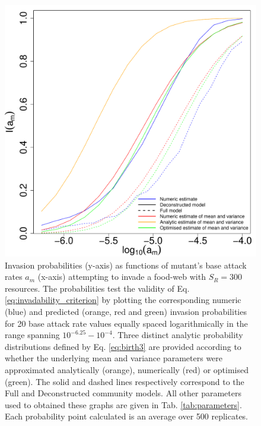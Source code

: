 \documentclass[a4paper]{report}
\begin{document}
{%
\begin{figure}[H]
\centering{}
\includegraphics[scale=0.5]{../Images/Invasion_Probabillity.pdf}
 \caption{Invasion probabilities (y-axis) as functions of mutant's base attack rates $a_m$ (x-axis) attempting to invade a food-web with $S_R=300$ resources. The probabilities test the validity of Eq. \eqref{eq:invadability_criterion} by plotting the corresponding numeric (blue) and predicted (orange, red and green) invasion probabilities for 20 base attack rate values equally spaced logarithmically in the range spanning $10^{-6.25} - 10^{-4}$. Three distinct analytic probability distributions defined by Eq. \eqref{eq:birth3} are provided according to whether the underlying mean and variance parameters were approximated analytically (orange), numerically (red) or optimised (green). The solid and dashed lines respectively correspond to the Full and Deconstructed community models. All other parameters used to obtained these graphs are given in Tab. \ref{tab:parameters}. Each probability point calculated is an average over 500 replicates. 
\label{fig:birth_prob}}
\end{figure}

}
\end{document}
